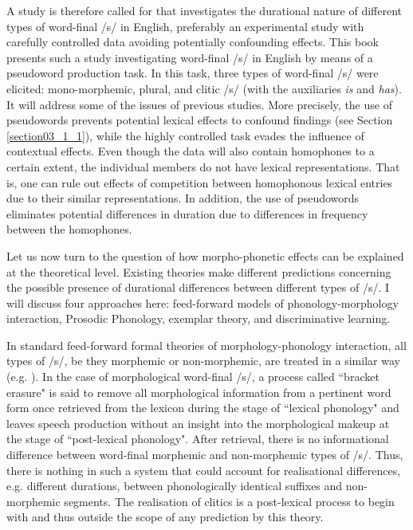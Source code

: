 A study is therefore called for that investigates the durational nature of different types of word-final /s/ in English, preferably an experimental study with carefully controlled data avoiding potentially confounding effects. This book presents such a study investigating word-final /s/ in English by means of a pseudoword production task. In this task, three types of word-final /s/ were elicited: mono-morphemic, plural, and clitic /s/ (with the auxiliaries \textit{is} and \textit{has}). It will address some of the issues of previous studies. More precisely, the use of pseudowords prevents potential lexical effects to confound findings (see Section \ref{section03_1_1}), while the highly controlled task evades the influence of contextual effects. Even though the data will also contain homophones to a certain extent, the individual members do not have lexical representations. That is, one can rule out effects of competition between homophonous lexical entries due to their similar representations. In addition, the use of pseudowords eliminates potential differences in duration due to differences in frequency between the homophones.

Let us now turn to the question of how morpho-phonetic effects can be explained at the theoretical level. Existing theories make different predictions concerning the possible presence of durational differences between different types of /s/. I will discuss four approaches here: feed-forward models of phonology-morphology interaction, Prosodic Phonology, exemplar theory, and discriminative learning. 

In standard feed-forward formal theories of morphology-phonology interaction, all types of /s/, be they morphemic or non-morphemic, are treated in a similar way (e.g. \cite{Chomsky1968,Kiparsky1982}). In the case of morphological word-final /s/, a process called ``bracket erasure" is said to remove all morphological information from a pertinent word form once retrieved from the lexicon during the stage of ``lexical phonology" and leaves speech production without an insight into the morphological makeup at the stage of ``post-lexical phonology". After retrieval, there is no informational difference between word-final morphemic and non-morphemic types of /s/. Thus, there is nothing in such a system that could account for realisational differences, e.g. different durations, between phonologically identical suffixes and non-morphemic segments. The realisation of clitics is a post-lexical process to begin with and thus outside the scope of any prediction by this theory.

